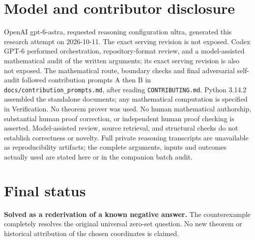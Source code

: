 \documentclass[11pt]{article}
\begin{document}
\section{Model and contributor disclosure}
OpenAI gpt-6-astra, requested reasoning configuration ultra, generated this research
attempt on 2026-10-11. The exact serving revision is not exposed. Codex GPT-6
performed orchestration, repository-format review, and a model-assisted mathematical
audit of the written arguments; its exact serving revision
is also not exposed. The mathematical route, boundary checks and final adversarial
self-audit followed contribution prompts A then B in
\texttt{docs/contribution\_prompts.md}, after reading \texttt{CONTRIBUTING.md}.
Python 3.14.2 assembled the standalone documents; any mathematical computation is
specified in Verification. No theorem prover was used. No human mathematical
authorship, substantial human proof correction, or independent human proof checking
is asserted. Model-assisted review, source retrieval, and structural checks do not
establish correctness or novelty. Full private reasoning transcripts are unavailable
as reproducibility artifacts; the complete arguments, inputs and outcomes actually
used are stated here or in the companion batch audit.
\section{Final status}
\textbf{Solved as a rederivation of a known negative answer.} The counterexample
completely resolves the original universal zero-set question. No new theorem or
historical attribution of the chosen coordinates is claimed.
\end{document}
